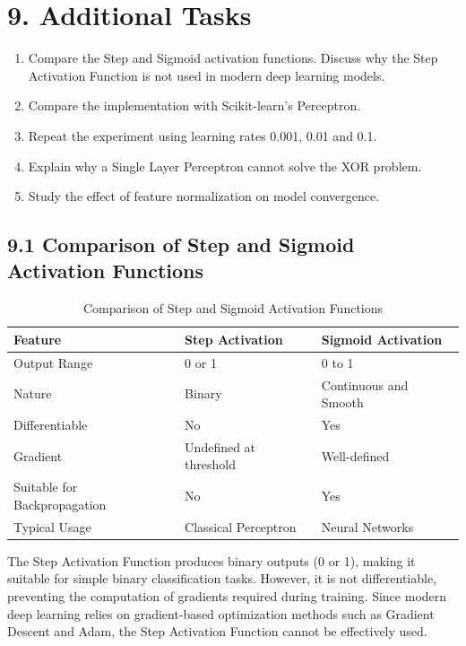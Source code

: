 \documentclass[11pt]{article}
\begin{document}
\section*{9. Additional Tasks}

\begin{enumerate}[leftmargin=*]
\item Compare the Step and Sigmoid activation functions. Discuss why the Step Activation Function is not used in modern deep learning models.
\item Compare the implementation with Scikit-learn's Perceptron.
\item Repeat the experiment using learning rates 0.001, 0.01 and 0.1.
\item Explain why a Single Layer Perceptron cannot solve the XOR problem.
\item Study the effect of feature normalization on model convergence.
\end{enumerate}




\subsection*{9.1 Comparison of Step and Sigmoid Activation Functions}


\begin{table}[H]
\centering
\caption{Comparison of Step and Sigmoid Activation Functions}
\label{tab:activation_comparison}
\begin{tabular}{|p{4cm}|p{4cm}|p{4cm}|}
\hline
\textbf{Feature} & \textbf{Step Activation} & \textbf{Sigmoid Activation} \\
\hline
Output Range & 0 or 1 & 0 to 1 \\
\hline
Nature & Binary & Continuous and Smooth \\
\hline
Differentiable & No & Yes \\
\hline
Gradient & Undefined at threshold & Well-defined \\
\hline
Suitable for Backpropagation & No & Yes \\
\hline
Typical Usage & Classical Perceptron & Neural Networks \\
\hline
\end{tabular}
\end{table}

The Step Activation Function produces binary outputs (0 or 1), making it suitable for simple binary classification tasks. However, it is not differentiable, preventing the computation of gradients required during training. Since modern deep learning relies on gradient-based optimization methods such as Gradient Descent and Adam, the Step Activation Function cannot be effectively used.
\end{document}
